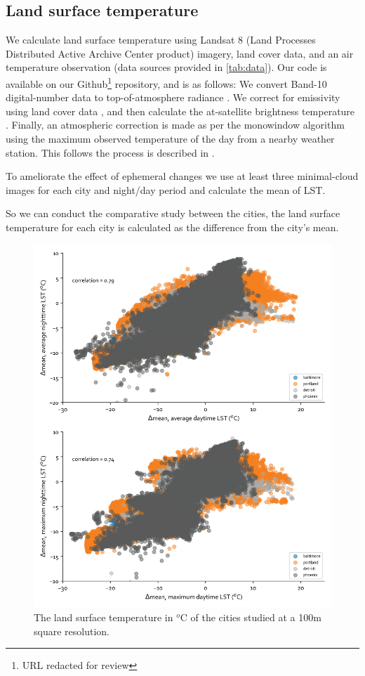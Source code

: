 \documentclass[final,3p,times,twocolumn,sort&compress]{elsarticle}
\begin{document}
\subsection{Land surface temperature}
We calculate land surface temperature using Landsat 8 (Land Processes Distributed Active Archive Center product) imagery, land cover data, and an air temperature observation (data sources provided in \ref{tab:data}). 
Our code is available on our Github\footnote{URL redacted for review} repository, and is as follows:
We convert Band-10 digital-number data to top-of-atmosphere radiance \cite{Jimenez-Munoz2003-wc}. 
We correct for emissivity using land cover data \cite{Alipour2003-ym}, and then calculate the at-satellite brightness temperature \cite{Jimenez-Munoz2003-wc}. 
Finally, an atmospheric correction is made as per the monowindow algorithm \cite{Qin2001-jn} using the maximum observed temperature of the day from a nearby weather station. 
This follows the process is described in \cite{Scott2016-lc}. 

To ameliorate the effect of ephemeral changes \cite{Zhou2018-iy} we use at least three minimal-cloud images for each city and night/day period and calculate the mean of LST.

So we can conduct the comparative study between the cities, the land surface temperature for each city is calculated as the difference from the city's mean. 

\begin{figure}
    \begin{center}
    \includegraphics[width=\linewidth]{fig/report/scatter_100.png}
    \caption{The land surface temperature in $^o$C of the cities studied at a 100m square resolution.}
    \label{fig:scatter_lst}
    \end{center}
\end{figure}
\end{document}
